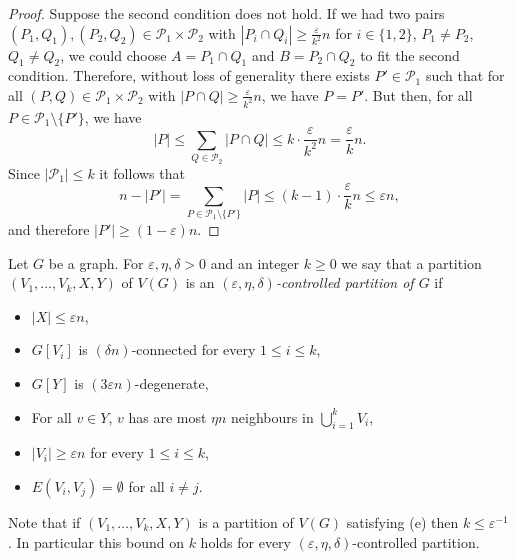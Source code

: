\documentclass{article}
\newtheorem{lem}[thm]{Lemma}
\newcommand{\eps}{\varepsilon}
\newcommand{\mc}[1]{\mathcal{#1}}
\begin{document}

\begin{proof} Suppose the second condition does not hold. If we had two pairs $(P_1, Q_1), (P_2, Q_2) \in \mathcal{P}_1 \times \mathcal{P}_2$ with $|P_i \cap Q_i| \geq \frac\eps{k^2} n$ for $i \in \{1, 2\}$, $P_1 \neq P_2$, $Q_1 \neq Q_2$, we could choose $A = P_1 \cap Q_1$ and $B = P_2 \cap Q_2$ to fit the second condition. Therefore, without loss of generality there exists $P' \in \mc{P}_1$ such that for all $(P, Q) \in \mathcal{P}_1 \times \mathcal{P}_2$ with $|P \cap Q| \geq \frac\eps{k^2} n$, we have $P = P'$. But then, for all $P \in \mathcal{P}_1 \setminus \{P'\}$, we have $$|P| \leq \sum_{Q \in \mathcal{P}_2} |P \cap Q| \leq k  \cdot \frac\eps{k^2}n = \frac\eps k n.$$ Since $|\mathcal{P}_1| \leq k$  it follows that $$n - |P'|  = \sum_{P \in \mathcal{P}_1 \setminus \{P'\}} |P|\leq (k-1) \cdot \frac\eps k n \leq \eps n,$$ and therefore  $|P'| \geq (1-\eps)n$.
\end{proof}

Let $G$ be a graph. For $\eps,\eta,\delta >0$ and an integer $k \geq 0$
we say that a partition $(V_1, \ldots, V_k, X, Y)$ of $V(G)$  is an \emph{$(\eps,\eta,\delta)$-controlled partition of $G$} if \begin{itemize}
	\item[(a)] $|X| \leq \eps n$,
	\item[(b)] $G[V_i]$ is $(\delta n)$-connected for every $1 \leq i \leq k$,
	\item[(c)] $G[Y]$ is $(3\eps n)$-degenerate,
	\item[(d)] For all $v \in Y$, $v$ has are most $\eta n$ neighbours in $\bigcup_{i=1}^k V_i$,
	\item[(e)] $|V_i| \geq \eps n$ for every $1 \leq i \leq k$,
	\item[(f)] $E(V_i, V_j) = \emptyset$ for all $i \neq j$.
\end{itemize}
Note that if $(V_1, \ldots, V_k, X, Y)$ is a partition of $V(G)$ satisfying (e) then $k \leq \eps^{-1}$. In particular this bound on $k$ holds for every $(\eps,\eta,\delta)$-controlled partition.
\end{document}
